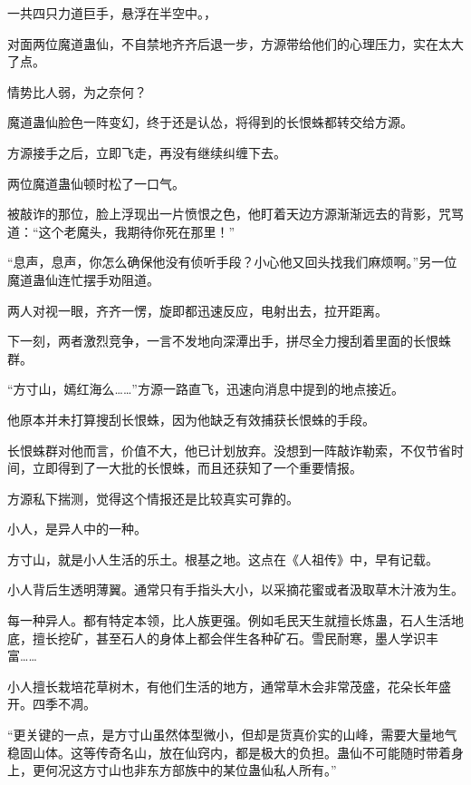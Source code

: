 
\begin{this_body}

一共四只力道巨手，悬浮在半空中。\male{}\male{}，

对面两位魔道蛊仙，不自禁地齐齐后退一步，方源带给他们的心理压力，实在太大了点。

情势比人弱，为之奈何？

魔道蛊仙脸色一阵变幻，终于还是认怂，将得到的长恨蛛都转交给方源。

方源接手之后，立即飞走，再没有继续纠缠下去。

两位魔道蛊仙顿时松了一口气。

被敲诈的那位，脸上浮现出一片愤恨之色，他盯着天边方源渐渐远去的背影，咒骂道：“这个老魔头，我期待你死在那里！”

“息声，息声，你怎么确保他没有侦听手段？小心他又回头找我们麻烦啊。”另一位魔道蛊仙连忙摆手劝阻道。

两人对视一眼，齐齐一愣，旋即都迅速反应，电射出去，拉开距离。

下一刻，两者激烈竞争，一言不发地向深潭出手，拼尽全力搜刮着里面的长恨蛛群。

“方寸山，嫣红海么……”方源一路直飞，迅速向消息中提到的地点接近。

他原本并未打算搜刮长恨蛛，因为他缺乏有效捕获长恨蛛的手段。

长恨蛛群对他而言，价值不大，他已计划放弃。没想到一阵敲诈勒索，不仅节省时间，立即得到了一大批的长恨蛛，而且还获知了一个重要情报。

方源私下揣测，觉得这个情报还是比较真实可靠的。

小人，是异人中的一种。

方寸山，就是小人生活的乐土。根基之地。这点在《人祖传》中，早有记载。

小人背后生透明薄翼。通常只有手指头大小，以采摘花蜜或者汲取草木汁液为生。

每一种异人。都有特定本领，比人族更强。例如毛民天生就擅长炼蛊，石人生活地底，擅长挖矿，甚至石人的身体上都会伴生各种矿石。雪民耐寒，墨人学识丰富……

小人擅长栽培花草树木，有他们生活的地方，通常草木会非常茂盛，花朵长年盛开。四季不凋。

“更关键的一点，是方寸山虽然体型微小，但却是货真价实的山峰，需要大量地气稳固山体。这等传奇名山，放在仙窍内，都是极大的负担。蛊仙不可能随时带着身上，更何况这方寸山也非东方部族中的某位蛊仙私人所有。”


\end{this_body}
